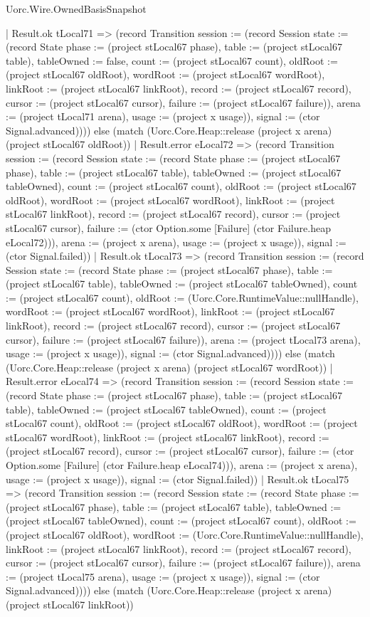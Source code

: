 \begin{lexlean}{Uorc.Wire.OwnedBasisSnapshot}
\begin{semanticmodule}
{      | Result.ok tLocal71 => (record Transition {session := (record Session {state := (record State {phase := (project stLocal67 phase), table := (project stLocal67 table), tableOwned := false, count := (project stLocal67 count), oldRoot := (project stLocal67 oldRoot), wordRoot := (project stLocal67 wordRoot), linkRoot := (project stLocal67 linkRoot), record := (project stLocal67 record), cursor := (project stLocal67 cursor), failure := (project stLocal67 failure)}), arena := (project tLocal71 arena), usage := (project x usage)}), signal := (ctor Signal.advanced)}))) else (match (Uorc.Core.Heap::release (project x arena) (project stLocal67 oldRoot))
      | Result.error eLocal72 => (record Transition {session := (record Session {state := (record State {phase := (project stLocal67 phase), table := (project stLocal67 table), tableOwned := (project stLocal67 tableOwned), count := (project stLocal67 count), oldRoot := (project stLocal67 oldRoot), wordRoot := (project stLocal67 wordRoot), linkRoot := (project stLocal67 linkRoot), record := (project stLocal67 record), cursor := (project stLocal67 cursor), failure := (ctor Option.some [Failure] (ctor Failure.heap eLocal72))}), arena := (project x arena), usage := (project x usage)}), signal := (ctor Signal.failed)})
      | Result.ok tLocal73 => (record Transition {session := (record Session {state := (record State {phase := (project stLocal67 phase), table := (project stLocal67 table), tableOwned := (project stLocal67 tableOwned), count := (project stLocal67 count), oldRoot := (Uorc.Core.RuntimeValue::nullHandle), wordRoot := (project stLocal67 wordRoot), linkRoot := (project stLocal67 linkRoot), record := (project stLocal67 record), cursor := (project stLocal67 cursor), failure := (project stLocal67 failure)}), arena := (project tLocal73 arena), usage := (project x usage)}), signal := (ctor Signal.advanced)}))) else (match (Uorc.Core.Heap::release (project x arena) (project stLocal67 wordRoot))
      | Result.error eLocal74 => (record Transition {session := (record Session {state := (record State {phase := (project stLocal67 phase), table := (project stLocal67 table), tableOwned := (project stLocal67 tableOwned), count := (project stLocal67 count), oldRoot := (project stLocal67 oldRoot), wordRoot := (project stLocal67 wordRoot), linkRoot := (project stLocal67 linkRoot), record := (project stLocal67 record), cursor := (project stLocal67 cursor), failure := (ctor Option.some [Failure] (ctor Failure.heap eLocal74))}), arena := (project x arena), usage := (project x usage)}), signal := (ctor Signal.failed)})
      | Result.ok tLocal75 => (record Transition {session := (record Session {state := (record State {phase := (project stLocal67 phase), table := (project stLocal67 table), tableOwned := (project stLocal67 tableOwned), count := (project stLocal67 count), oldRoot := (project stLocal67 oldRoot), wordRoot := (Uorc.Core.RuntimeValue::nullHandle), linkRoot := (project stLocal67 linkRoot), record := (project stLocal67 record), cursor := (project stLocal67 cursor), failure := (project stLocal67 failure)}), arena := (project tLocal75 arena), usage := (project x usage)}), signal := (ctor Signal.advanced)}))) else (match (Uorc.Core.Heap::release (project x arena) (project stLocal67 linkRoot))
}
\end{semanticmodule}
\end{lexlean}
